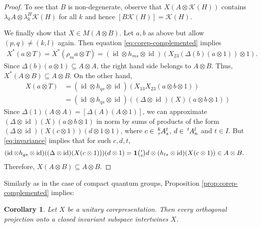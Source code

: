 \documentclass[11pt]{article}
\DeclareMathOperator{\id}{id}
\newcommand{\Grt}[3]{#1{\tiny {\begin{pmatrix} #2\\#3\end{pmatrix}}}}
\newcommand{\UnitC}[2]{\Grt{\mathbf{1}}{#1}{#2}}
\newcommand{\Gr}[5]{\,\tensor*[^{#2}_{#4}]{#1}{^{#3}_{#5}}}%
\newtheorem{Cor}[Theorem]{Corollary}
\theoremstyle{definition}
\numberwithin{equation}{section}
\begin{document}
\begin{proof}
To see that $B$ is non-degenerate, observe that $X(A\otimes
\mathcal{K}(H))$ contains $\lambda_{k}A \otimes
\lambda_{k}^{H}\mathcal{K}(H)$ for all $k$ and hence
$[B\mathcal{K}(H)]=\mathcal{K}(H)$.

We finally show that $X \in M(A\otimes B)$.  Let $a,b$ as above but
allow $(p,q)\neq (k,l)$ again. 
Then
equation \eqref{eq:corep-complemented}  implies 
\begin{align*}
  X^{*}(a\otimes T) = X^{*}(\rho_{m}a\otimes T) = (\id \otimes h_{ms}
  \otimes \id)(X_{23}(\Delta(b)(a\otimes 1))\otimes 1).
\end{align*}
Since $\Delta(b)(a\otimes 1) \subseteq A\otimes A$, the right hand
side belongs to $A\otimes B$. Thus, $X^{*}(A\otimes B) \subseteq
A\otimes B$. On the other hand, 
\begin{align*}
  X(a\otimes T) &= (\id \otimes h_{qs} \otimes
  \id)(X_{13}X_{23}(a\otimes b\otimes 1)) \\ &= (\id \otimes h_{qs}
  \otimes \id)((\Delta \otimes \id)(X)(a\otimes b\otimes 1)) 
\end{align*}
Since $\Delta(1)(A \otimes A) = [\Delta(A)(A \otimes 1)]$, we can
approximate $(\Delta \otimes \id)(X)(a\otimes b\otimes 1)$ in norm by sums of
products of the form $(\Delta \otimes\id)(X(c\otimes 1))(d \otimes
1\otimes 1)$, where %
$c\in \Gr{A}{k}{t}{r}{s}$, $d \in
\Gr{A}{t}{l}{}{n}$ and $t\in I$. But \eqref{eq:invariance} implies that for such $c,d,t$,
\begin{align*}
(\id \otimes h_{qs} 
  \otimes \id)(  (\Delta \otimes\id)(X(c\otimes 1)))(d \otimes %
1) &= \UnitC{t}{q}d \otimes (h_{ts} \otimes \id)(X(c\otimes 1)) \in A
\otimes B.
\end{align*}
Therefore, $X(A \otimes B) \subseteq A\otimes B$.
  \end{proof}

Similarly as in the case of compact quantum groups, Proposition \ref{prop:corep-complemented}
implies:
\begin{Cor} \label{cor:invariant-complemented}
  Let $X$ be a unitary corepresentation. Then every orthogonal projection onto a closed invariant
  subspace intertwines $X$.
\end{Cor}

\end{document}
